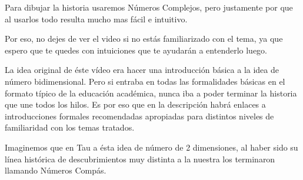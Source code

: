 \documentclass[preview]{standalone}
\begin{document}
\begin{center}
Para dibujar la historia usaremos Números Complejos, pero justamente por que al usarlos todo resulta mucho mas fácil e intuitivo.

Por eso, no dejes de ver el video si no estás familiarizado con el tema, ya que espero que te quedes con intuiciones que te ayudarán a entenderlo luego. 

La idea original de éste vídeo era hacer una introducción básica a la idea de número bidimensional. Pero si entraba en todas las formalidades básicas en el formato típico  de la educación académica, nunca iba a poder terminar la historia que une todos los hilos. Es por eso que en la descripción habrá enlaces a introducciones formales recomendadas apropiadas para distintos niveles de familiaridad con los temas tratados. 

Imaginemos que en Tau a ésta idea de número de 2 dimensiones, al haber sido su línea histórica de descubrimientos muy distinta a la nuestra los terminaron llamando Números Compás.
\end{center}
\end{document}

